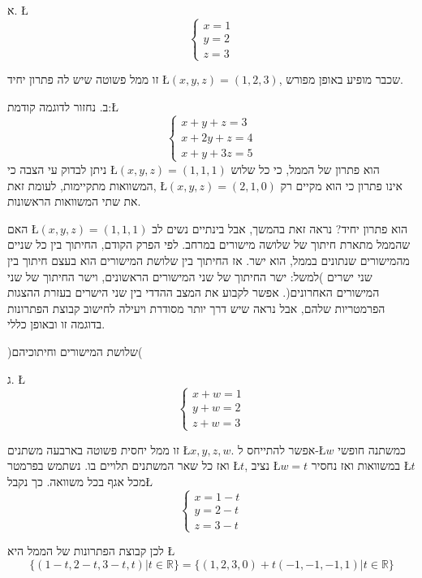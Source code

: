 \begin{examples}
א. \L{%
\[
\begin{cases}
x=1\\
y=2\\
z=3
\end{cases}
\]
}%

זו ממ\textquotedbl ל פשוטה שיש לה פתרון יחיד \L{$(x,y,z)=(1,2,3)$},
שכבר מופיע באופן מפורש.

ב. נחזור לדוגמה קודמת:\L{%
\[
\begin{cases}
x+y+z=3\\
x+2y+z=4\\
x+y+3z=5
\end{cases}
\]
}%
ניתן לבדוק ע\textquotedbl י הצבה כי \L{$(x,y,z)=(1,1,1)$} הוא פתרון
של הממ\textquotedbl ל, כי כל שלוש המשוואות מתקיימות, לעומת זאת, \L{$(x,y,z)=(2,1,0)$}
אינו פתרון כי הוא מקיים רק את שתי המשוואות הראשונות. 

האם \L{$(x,y,z)=(1,1,1)$} הוא פתרון יחיד? נראה זאת בהמשך, אבל בינתיים
נשים לב שהממ\textquotedbl ל מתארת חיתוך של שלושה מישורים במרחב. לפי
הפרק הקודם, החיתוך בין כל שניים מהמישורים שנתונים בממ\textquotedbl ל,
הוא ישר. אז החיתוך בין שלושת המישורים הוא בעצם חיתוך בין שני ישרים
)למשל: ישר החיתוך של שני המישורים הראשונים, וישר החיתוך של שני המישורים
האחרונים(. אפשר לקבוע את המצב ההדדי בין שני הישרים בעזרת ההצגות הפרמטריות
שלהם, אבל נראה שיש דרך יותר מסודרת ויעילה לחישוב קבוצת הפתרונות בדוגמה
זו ובאופן כללי.

\begin{center}
)שלושת המישורים וחיתוכיהם(
\par\end{center}

ג. \L{%
\[
\begin{cases}
x+w=1\\
y+w=2\\
z+w=3
\end{cases}
\]
}%

זו ממ\textquotedbl ל יחסית פשוטה בארבעה משתנים \L{$x,y,z,w$}. אפשר
להתייחס ל-\L{$w$} כמשתנה חופשי ואז כל שאר המשתנים תלויים בו. נשתמש
בפרמטר \L{$t$}, נציב \L{$w=t$} במשוואות ואז נחסיר \L{$t$} מכל אגף
בכל משוואה. כך נקבל\L{%
\[
\begin{cases}
x=1-t\\
y=2-t\\
z=3-t
\end{cases}
\]
}%

לכן קבוצת הפתרונות של הממ\textquotedbl ל היא \L{%
\[
\{(1-t,2-t,3-t,t)|t\in\mathbb{R}\}=\{(1,2,3,0)+t(-1,-1,-1,1)|t\in\mathbb{R}\}
\]
}%


\end{examples}
